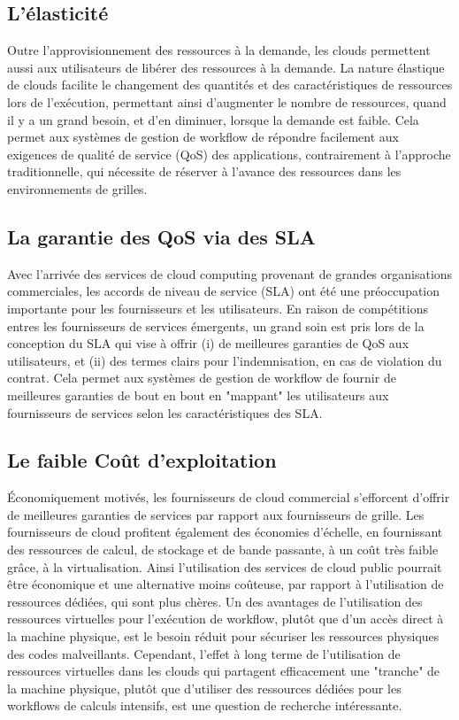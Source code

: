\subsection{L’élasticité}
Outre l’approvisionnement des ressources à la demande, les clouds permettent aussi aux utilisateurs de libérer des ressources à la demande. La nature élastique de clouds facilite le changement des quantités et des caractéristiques de ressources lors de l'exécution, permettant ainsi d’augmenter le nombre de ressources, quand il y a un grand besoin, et d’en diminuer, lorsque la demande est faible. Cela permet aux systèmes de gestion de workflow de répondre facilement aux exigences de qualité de service (QoS) des applications, contrairement à l'approche traditionnelle, qui nécessite de réserver à l'avance des ressources dans les environnements de grilles. 
\subsection{La garantie des QoS via des SLA }
Avec l’arrivée des services de cloud computing  provenant de grandes organisations commerciales, les accords de niveau de service (SLA) ont été une préoccupation importante pour les fournisseurs et les utilisateurs. En raison de compétitions entres les fournisseurs de services émergents, un grand soin est pris lors de la conception du SLA qui vise à offrir (i) de meilleures garanties de QoS aux utilisateurs, et (ii) des termes clairs pour l'indemnisation, en cas de violation du contrat. Cela permet aux systèmes de gestion de workflow de fournir de meilleures garanties de bout en bout en "mappant" les utilisateurs aux fournisseurs de services selon les caractéristiques des SLA.

\subsection{Le faible Coût d’exploitation }
 Économiquement motivés, les fournisseurs de cloud commercial s'efforcent d'offrir de meilleures garanties de services par rapport aux fournisseurs de grille. Les fournisseurs de cloud profitent également des économies d'échelle, en fournissant des ressources de calcul, de stockage et de bande passante, à un coût très faible grâce, à la virtualisation. Ainsi l'utilisation des services de cloud public pourrait être économique et une alternative moins coûteuse, par rapport à l’utilisation de ressources dédiées, qui sont plus chères. Un des avantages de l'utilisation des ressources virtuelles pour l'exécution de workflow, plutôt que d'un accès direct à la machine physique, est le besoin réduit pour sécuriser les ressources physiques des codes malveillants. Cependant, l'effet à long terme de l'utilisation de ressources virtuelles dans les clouds qui partagent efficacement une "tranche" de la machine physique, plutôt que d'utiliser des ressources dédiées pour les workflows de calculs intensifs, est une question de recherche intéressante.
 
